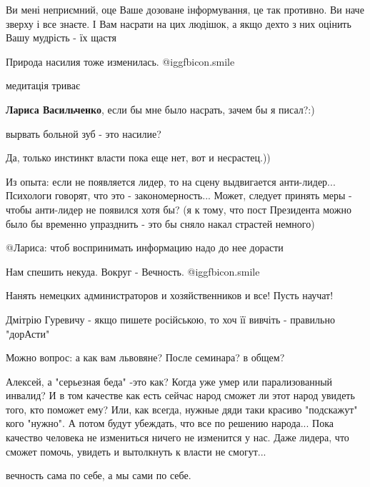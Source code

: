 \begin{itemize}

Ви мені неприємний, оце Ваше дозоване інформування, це так противно. Ви наче
зверху і все знаєте. І Вам насрати на цих людішок, а якщо дехто з них оцінить
Вашу мудрість - їх щастя

Природа насилия тоже изменилась. @igg{fbicon.smile} 

медитація триває

\textbf{Лариса Васильченко}, если бы мне было насрать, зачем бы я писал?:)

вырвать больной зуб - это насилие?

Да, только инстинкт власти пока еще нет, вот и несрастец.))


Из опыта: если не появляется лидер, то на сцену выдвигается анти-лидер...
Психологи говорят, что это - закономерность... Может, следует принять меры -
чтобы анти-лидер не появился хотя бы? (я к тому, что пост Президента можно было
бы временно упразднить - это бы сняло накал страстей немного)

@Лариса: чтоб воспринимать информацию надо до нее дорасти

Нам спешить некуда. Вокруг - Вечность. @igg{fbicon.smile} 

Нанять немецких администраторов и хозяйственников и все! Пусть научат!

Дмітрію Гуревичу - якщо пишете російською, то хоч її вивчіть - правильно "дорАсти"

Можно вопрос: а как вам львовяне? После семинара? в общем?


Алексей, а "серьезная беда" -это как? Когда уже умер или парализованный
инвалид? И в том качестве как есть сейчас народ сможет ли этот народ увидеть
того, кто поможет ему? Или, как всегда, нужные дяди таки красиво "подскажут"
кого "нужно". А потом будут убеждать, что все по решению народа... Пока
качество человека не измениться ничего не изменится у нас. Даже лидера, что
сможет помочь, увидеть и вытолкнуть к власти не смогут...

вечность сама по себе, а мы сами по себе.



\end{itemize}
